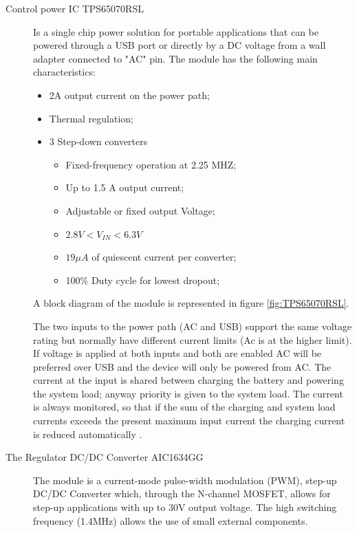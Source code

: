\documentclass[11pt,a4paper,titlepage]{article}
\begin{document}
        \begin{description}
          \item [Control power IC TPS65070RSL] Is a single chip power solution for portable applications that can be powered through a USB port or directly by a DC voltage from a wall adapter connected to "AC" pin. The module has the following main characteristics:
            \begin{itemize}
              \item 2A output current on the power path;
              \item Thermal regulation;
              \item 3 Step-down converters
                \begin{itemize}
                  \item Fixed-frequency operation at 2.25 MHZ;
                  \item Up to 1.5 A output current;
                  \item Adjustable or fixed output Voltage;
                  \item $2.8V < V_{IN} < 6.3V$
                  \item $19\mu A$ of quiescent current per converter;
                  \item 100\% Duty cycle for lowest dropout;
                \end{itemize}
            \end{itemize}
          A block diagram of the module is represented in figure \autoref{fig:TPS65070RSL}.

          The two inputs to the power path (AC and USB) support the same voltage rating but normally have different current limits (Ac is at the higher limit). If voltage is applied at both inputs and both are enabled AC will be preferred over USB and the device will only be powered from AC. The current at the input is shared between charging the battery and powering the system load; anyway priority is given to the system load. The current is always monitored, so that if the sum of the charging and
          system load currents exceeds the present maximum input current the charging current is reduced automatically \cite{ICpower}.

          \item[The Regulator DC/DC Converter AIC1634GG] The module is a current-mode pulse-width modulation (PWM), step-up DC/DC Converter which, through the N-channel MOSFET, allows for step-up applications with up to 30V output voltage. The high switching frequency (1.4MHz) allows the use of small external components.


\end{description}
\end{document}
